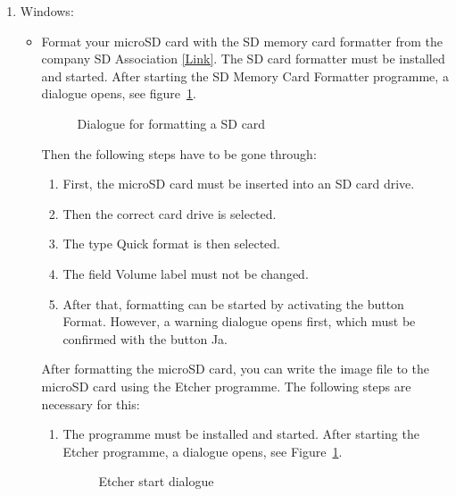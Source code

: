 \begin{enumerate}
  \item Windows:
	\begin{itemize}
		\item Format your microSD card with the SD memory card formatter from the company SD Association \href{https://www.sdcard.org/downloads/formatter/}{[Link]}. The SD card formatter must be installed and started.  After starting the SD Memory Card Formatter programme, a dialogue opens, see figure~\ref{JetPack:SdFormatierer}.
		
		\begin{figure}
			\centering
			
			\caption{Dialogue for formatting a SD card}\label{JetPack:SdFormatierer}
		\end{figure}
		
        Then the following steps have to be gone through:

		  
		\begin{enumerate}  	  
		  \item First, the microSD card must be inserted into an SD card drive.
          \item Then the correct card drive is selected.
          \item The type \glqq Quick format\grqq{} is then selected.
          \item The field \glqq Volume label\grqq{} must not be changed.
          \item After that, formatting can be started by activating the button \glqq Format\grqq. However, a warning dialogue opens first, which must be confirmed with the button \glqq Ja\grqq{}.
		\end{enumerate}
		
		After formatting the microSD card, you can write the image file to the microSD card using the Etcher programme. The following steps are necessary for this:
		
		\begin{enumerate}  	      	
			
			\item  The programme must be installed and started. After starting the Etcher programme, a dialogue opens, see Figure~\ref{JetPack:SdFormatierer}.
			
		    \begin{figure}
		      \centering
			  \caption{Etcher start dialogue}\label{JetPack:Etcher}
		    \end{figure}
			

\end{enumerate}
\end{itemize}
\end{enumerate}
